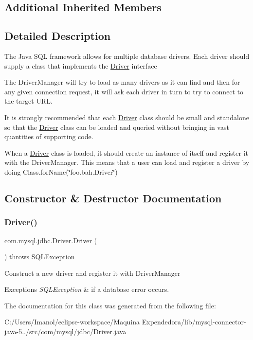 \subsection*{Additional Inherited Members}


\subsection{Detailed Description}
The Java S\+QL framework allows for multiple database drivers. Each driver should supply a class that implements the \mbox{\hyperlink{classcom_1_1mysql_1_1jdbc_1_1_driver}{Driver}} interface

The Driver\+Manager will try to load as many drivers as it can find and then for any given connection request, it will ask each driver in turn to try to connect to the target U\+RL.

It is strongly recommended that each \mbox{\hyperlink{classcom_1_1mysql_1_1jdbc_1_1_driver}{Driver}} class should be small and standalone so that the \mbox{\hyperlink{classcom_1_1mysql_1_1jdbc_1_1_driver}{Driver}} class can be loaded and queried without bringing in vast quantities of supporting code.

When a \mbox{\hyperlink{classcom_1_1mysql_1_1jdbc_1_1_driver}{Driver}} class is loaded, it should create an instance of itself and register it with the Driver\+Manager. This means that a user can load and register a driver by doing Class.\+for\+Name(\char`\"{}foo.\+bah.\+Driver\char`\"{}) 

\subsection{Constructor \& Destructor Documentation}
\mbox{\label{classcom_1_1mysql_1_1jdbc_1_1_driver_a55d93610188df37d4699e34b19519728}} 
\subsubsection{\texorpdfstring{Driver()}{Driver()}}
{\footnotesize\ttfamily com.\+mysql.\+jdbc.\+Driver.\+Driver (\begin{DoxyParamCaption}{ }\end{DoxyParamCaption}) throws S\+Q\+L\+Exception}

Construct a new driver and register it with Driver\+Manager


\begin{DoxyExceptions}{Exceptions}
{\em S\+Q\+L\+Exception} & if a database error occurs. \\
\hline
\end{DoxyExceptions}


The documentation for this class was generated from the following file\+:\begin{DoxyCompactItemize}
\item 
C\+:/\+Users/\+Imanol/eclipse-\/workspace/\+Maquina Expendedora/lib/mysql-\/connector-\/java-\/5../src/com/mysql/jdbc/Driver.\+java\end{DoxyCompactItemize}
